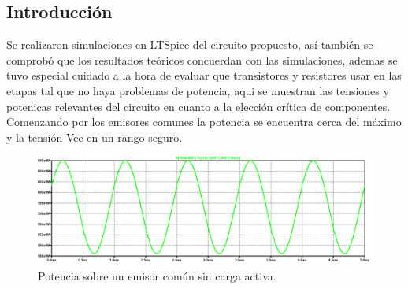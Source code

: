 



\subsection{Introducción}
Se realizaron simulaciones en LTSpice del circuito propuesto, así también se comprobó que los resultados teóricos concuerdan con las simulaciones, ademas se tuvo especial cuidado a la hora de evaluar que transistores y resistores usar en las etapas tal que no haya problemas de potencia, aqui se muestran las tensiones y potenicas relevantes del circuito en cuanto a la elección crítica de componentes.\\
Comenzando por los emisores comunes la potencia se encuentra cerca del máximo y la tensión Vce en un rango seguro.
\begin{figure}[H]
	\centering
	\includegraphics[width=\textwidth]{ImagenesSimulaciones/PEC1.png}
	\caption{Potencia sobre un emisor común sin carga activa.}
	\label{fig:pec1}
\end{figure}
